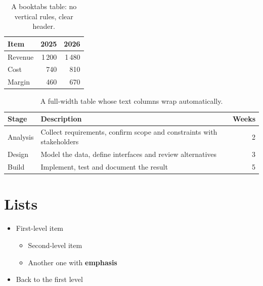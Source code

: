 \documentclass[10pt, a4paper]{article}
\begin{document}
\begin{table}[H]
    \centering
    \caption{A booktabs table: no vertical rules, clear header.}
    \label{tab:cookbook-booktabs}
    \begin{tabular}{lrr}
        \toprule
        \textbf{Item} & \textbf{2025} & \textbf{2026} \\
        \midrule
        Revenue       & 1\,200        & 1\,480        \\
        Cost          & 740           & 810           \\
        Margin        & 460           & 670           \\
        \bottomrule
    \end{tabular}
\end{table}

\begin{table}[H]
    \centering
    \caption{A full-width table whose text columns wrap automatically.}
    \label{tab:cookbook-wide}
    \begin{tabularx}{\textwidth}{lX r}
        \toprule
        \textbf{Stage} & \textbf{Description} & \textbf{Weeks} \\
        \midrule
        Analysis       & Collect requirements, confirm scope and constraints with stakeholders & 2 \\
        Design         & Model the data, define interfaces and review alternatives & 3 \\
        Build          & Implement, test and document the result & 5 \\
        \bottomrule
    \end{tabularx}
\end{table}

\section{Lists}

\begin{itemize}
    \item First-level item
    \begin{itemize}
        \item Second-level item
        \item Another one with \textbf{emphasis}
    \end{itemize}
    \item Back to the first level
\end{itemize}
\end{document}

